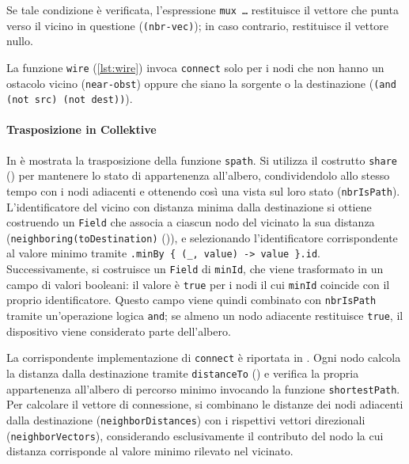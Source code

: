 Se tale condizione è verificata, l'espressione \texttt{mux \dots} restituisce il vettore che punta verso il vicino in questione (\texttt{(nbr-vec)}); in caso contrario, restituisce il vettore nullo.



La funzione \texttt{wire} (\cref{lst:wire}) invoca \texttt{connect} solo per i nodi che non hanno un ostacolo vicino (\texttt{near-obst}) oppure che siano la sorgente o la destinazione (\texttt{(and (not src) (not dest))}).




\paragraph{Trasposizione in Collektive} In  è mostrata la trasposizione della funzione \texttt{spath}. 
%
Si utilizza il costrutto \texttt{share} () per mantenere lo stato di appartenenza all'albero, condividendolo allo stesso tempo con i nodi adiacenti e ottenendo così una vista sul loro stato (\texttt{nbrIsPath}).
%
L'identificatore del vicino con distanza minima dalla destinazione si ottiene costruendo un \texttt{Field} che associa a ciascun nodo del vicinato la sua distanza (\texttt{neighboring(toDestination)} ()), e selezionando l'identificatore corrispondente al valore minimo tramite \texttt{.minBy \{ (\_, value) -> value \}.id}.
%
Successivamente, si costruisce un \texttt{Field} di \texttt{minId}, che viene trasformato in un campo di valori booleani: il valore è \texttt{true} per i nodi il cui \texttt{minId} coincide con il proprio identificatore. Questo campo viene quindi combinato con \texttt{nbrIsPath} tramite un'operazione logica \texttt{and}; se almeno un nodo adiacente restituisce \texttt{true}, il dispositivo viene considerato parte dell'albero.

La corrispondente implementazione di \texttt{connect} è riportata in .
%
Ogni nodo calcola la distanza dalla destinazione tramite \texttt{distanceTo} () e verifica la propria appartenenza all'albero di percorso minimo invocando la funzione \texttt{shortestPath}.
%
Per calcolare il vettore di connessione, si combinano le distanze dei nodi adiacenti dalla destinazione (\texttt{neighborDistances}) con i rispettivi vettori direzionali (\texttt{neighborVectors}), considerando esclusivamente il contributo del nodo la cui distanza corrisponde al valore minimo rilevato nel vicinato.

